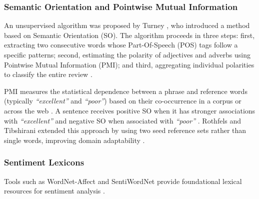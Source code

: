 \documentclass[a4paper,twoside,12pt]{book}
\newcommand{\literal}[1]{\textit{``#1''}}
\begin{document}
\subsubsection{Semantic Orientation and Pointwise Mutual Information}
An unsupervised algorithm was proposed by Turney \cite{azzeddine2018sentiment, behdenna2018document}, who introduced a method based on Semantic Orientation (SO). The algorithm proceeds in three steps: first, extracting two consecutive words whose Part-Of-Speech (POS) tags follow a specific patterns; second, estimating the polarity of adjectives and adverbs using Pointwise Mutual Information (PMI); and third, aggregating individual polarities to classify the entire review \cite{azzeddine2018sentiment}.

PMI measures the statistical dependence between a phrase and reference words (typically \literal{excellent} and \literal{poor}) based on their co-occurrence in a corpus or across the web \cite{azzeddine2018sentiment}. A sentence receives positive SO when it has stronger associations with \literal{excellent} and negative SO when associated with \literal{poor} \cite{behdenna2018document}. Rothfels and Tibshirani extended this approach by using two seed reference sets rather than single words, improving domain adaptability  \cite{behdenna2018document}.

\subsubsection{Sentiment Lexicons}

Tools such as WordNet-Affect and SentiWordNet provide foundational lexical resources for sentiment analysis \cite{nursal2025battle}.
\end{document}
